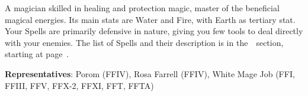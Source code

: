 \begin{jobdesc}[name=pjob-whitemage]
    A magician skilled in healing and protection magic, master of the beneficial magical energies. Its main stats are Water and Fire, with Earth as tertiary stat. Your Spells are primarily defensive in nature, giving you few tools to deal directly with your enemies. The list of Spells and their description is in the~~section, starting at page~\pageref{sec:magic-white}. \pc%

    \textbf{Representatives}: Porom (FFIV), Rosa Farrell (FFIV), White Mage Job (FFI, FFIII, FFV, FFX-2, FFXI, FFT, FFTA) \pc%

    \jobstats[hpa=3x,hpb=4x,hpc=5x,hpd=6x,mpa=2x,mpb=3x,mpc=4x,armor=Light,weapons=Claws / Gloves \\ Staves \\ Wands]
\end{jobdesc}

